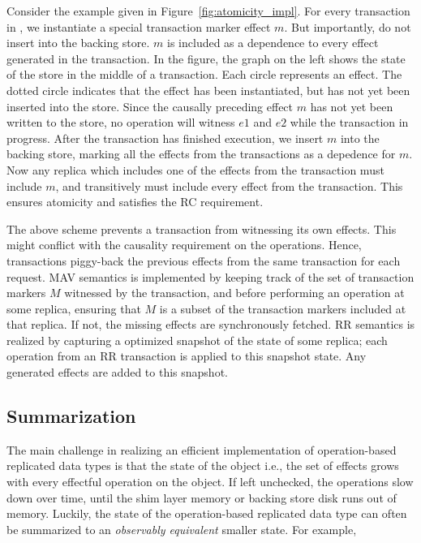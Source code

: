 Consider the example given in Figure~\ref{fig:atomicity_impl}. For every
transaction in \quelea, we instantiate a special transaction marker effect $m$.
But importantly, do not insert into the backing store. $m$ is included as a
dependence to every effect generated in the transaction. In the figure, the
graph on the left shows the state of the store in the middle of a transaction.
Each circle represents an effect. The dotted circle indicates that the effect
has been instantiated, but has not yet been inserted into the store. Since the
causally preceding effect $m$ has not yet been written to the store, no
operation will witness $e1$ and $e2$ while the transaction in progress. After
the transaction has finished execution, we insert $m$ into the backing store,
marking all the effects from the transactions as a depedence for $m$. Now any
replica which includes one of the effects from the transaction must include
$m$, and transitively must include every effect from the transaction. This
ensures atomicity and satisfies the RC requirement.

The above scheme prevents a transaction from witnessing its own effects. This
might conflict with the causality requirement on the operations. Hence,
transactions piggy-back the previous effects from the same transaction for each
request. MAV semantics is implemented by keeping track of the set of
transaction markers $M$ witnessed by the transaction, and before performing an
operation at some replica, ensuring that $M$ is a subset of the transaction
markers included at that replica. If not, the missing effects are synchronously
fetched. RR semantics is realized by capturing a optimized snapshot of the
state of some replica; each operation from an RR transaction is applied to this
snapshot state. Any generated effects are added to this snapshot.

\subsection{Summarization}

The main challenge in realizing an efficient implementation of operation-based
replicated data types is that the state of the object i.e., the set of effects
grows with every effectful operation on the object. If left unchecked, the
operations slow down over time, until the shim layer memory or backing store
disk runs out of memory. Luckily, the state of the operation-based replicated
data type can often be summarized to an \emph{observably equivalent} smaller
state. For example,

